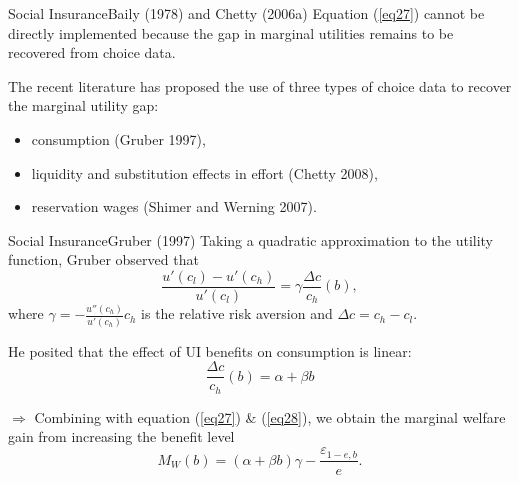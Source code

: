 \documentclass{beamer}
\begin{document}
\begin{frame}{Social Insurance}{Baily (1978) and Chetty (2006a)}
	Equation (\ref{eq27}) cannot be directly implemented because the gap in marginal utilities remains to be recovered from choice data.
	\medskip

	The recent literature has proposed the use of three types of choice data to recover the marginal utility gap:
	\begin{itemize}
		\item consumption (Gruber 1997),
		\item liquidity and substitution effects in effort (Chetty 2008),
		\item reservation wages (Shimer and Werning 2007).
	\end{itemize}
\end{frame}
\begin{frame}{Social Insurance}{Gruber (1997)}
	Taking a quadratic approximation to the utility function, Gruber observed that
	\begin{equation}\label{eq28}
		\frac{u'(c_l)-u'(c_h)}{u'(c_l)} = \gamma \frac{\Delta c}{c_h}(b),
	\end{equation}
	where $\gamma = -\frac{u''(c_h)}{u'(c_h)}c_h$ is the relative risk aversion and $\Delta c = c_h - c_l$.
	\medskip

	He posited that the effect of UI benefits on consumption is linear:
	\begin{equation}
		\frac{\Delta c}{c_h}(b)=\alpha + \beta b
	\end{equation}

	$\Rightarrow$ Combining with equation (\ref{eq27}) \& (\ref{eq28}), we obtain the marginal welfare gain from increasing the benefit level
	\begin{equation}
		M_W(b) = (\alpha+\beta b)\gamma - \frac{\varepsilon_{1-e,b}}{e}.
	\end{equation}
\end{frame}
\end{document}
